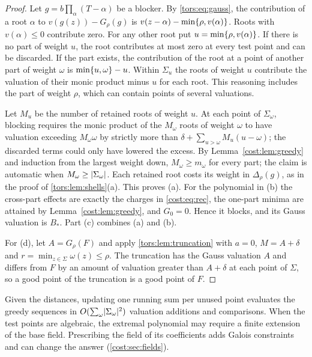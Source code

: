 \begin{proof}
Let $g=b\prod_\alpha(T-\alpha)$ be a blocker. By \eqref{tors:eq:gauss}, the contribution
of a root $\alpha$ to $v(g(z))-G_\rho(g)$ is $v(z-\alpha)-\min\{\rho,v(\alpha)\}$. Roots
with $v(\alpha)\le0$ contribute zero. For any other root put
$u=\min\{\rho,v(\alpha)\}$. If there is no part of weight $u$, the root contributes at
most zero at every test point and can be discarded. If the part exists, the contribution of
the root at a point of another part of weight $\omega$ is $\min\{u,\omega\}-u$. Within
$\Sigma_u$ the roots of weight $u$ contribute the valuation of their monic product minus
$u$ for each root. This reasoning includes the part of weight $\rho$, which can contain
points of several valuations.

Let $M_u$ be the number of retained roots of weight $u$. At each point of $\Sigma_\omega$,
blocking requires the monic product of the $M_\omega$ roots of weight $\omega$ to have
valuation exceeding $M_\omega\omega$ by strictly more than
$\delta+\sum_{u>\omega}M_u(u-\omega)$; the discarded terms could only have lowered the
excess. By Lemma~\ref{cost:lem:greedy} and induction from the largest weight down,
$M_\omega\ge m_\omega$ for every part; the claim is automatic when
$M_\omega\ge\lvert\Sigma_\omega\rvert$. Each retained root costs its weight in $\Delta_\rho(g)$,
as in the proof of \cref{tors:lem:shells}(a). This proves (a). For the polynomial in (b)
the cross-part effects are exactly the charges in \eqref{cost:eq:rec}, the one-part minima
are attained by Lemma~\ref{cost:lem:greedy}, and $G_0=0$. Hence it blocks, and its Gauss
valuation is $B_*$. Part (c) combines (a) and (b).

For (d), let $A=G_\rho(F)$ and apply \cref{tors:lem:truncation} with $a=0$, $M=A+\delta$
and $r=\min_{z\in\Sigma}\omega(z)\le\rho$. The truncation has the Gauss valuation $A$ and
differs from $F$ by an amount of valuation greater than $A+\delta$ at each point of
$\Sigma$, so a good point of the truncation is a good point of $F$.
\end{proof}

Given the distances, updating one running sum per unused point evaluates the greedy
sequences in $O(\sum_\omega\lvert\Sigma_\omega\rvert^2)$ valuation additions and comparisons. When
the test points are algebraic, the extremal polynomial may require a finite extension of the
base field. Prescribing the field of its coefficients adds Galois constraints and can change
the answer (\cref{cost:sec:fields}).

